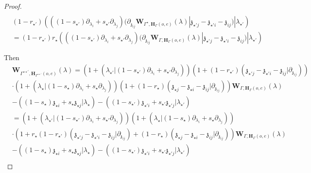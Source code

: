 \documentclass[11pt]{amsart}
\theoremstyle{definition}
\theoremstyle{remark}
\numberwithin{equation}{section}
\begin{document}
\begin{proof}
\begin{align*}
\end{align*}
\begin{align*}
   & (1-r_{\star'})   \left(((1-s_{\star'})\partial_{\lambda_i}+s_{\star'}\partial_{\lambda_j})(\partial_{\mathfrak{z}_{ij}}\mathbf{W}_{\Gamma^{\star},\mathbf{H}_{\Gamma}(o,e)}(\lambda)|\mathfrak{z}_{\star' j}-\mathfrak{z}_{\star' i}-\mathfrak{z}_{ij})|\lambda_{\star'}\right) \\
   &=  (1-r_{\star'})   r_{\star} \left(((1-s_{\star'})\partial_{\lambda_i}+s_{\star'}\partial_{\lambda_j})(\partial_{\mathfrak{z}_{ij}}\mathbf{W}_{\Gamma,\mathbf{H}_{\Gamma}(o,e)}(\lambda)|\mathfrak{z}_{\star' j}-\mathfrak{z}_{\star' i}-\mathfrak{z}_{ij})|\lambda_{\star'}\right)
\end{align*}

\fi

  Then
  \begin{align*}
& \mathbf{W}_{\Gamma^{\star\star'},\mathbf{H}_{\Gamma^{\star\star'}}(o,e)}(\lambda)  =\left(1+(\lambda_{\star'}|(1-s_{\star'})\partial_{\lambda_i}+s_{\star'}\partial_{\lambda_j})\right)\left(1+(1-r_{\star'})(\mathfrak{z}_{\star' j}-\mathfrak{z}_{\star' i}-\mathfrak{z}_{ij}|\partial_{\mathfrak{z}_{ij}})\right)\\
&\cdot \left(1+(\lambda_{\star}|(1-s_{\star})\partial_{\lambda_i}+s_{\star}\partial_{\lambda_j})\right)\left(1+(1-r_{\star})(\mathfrak{z}_{\star j}-\mathfrak{z}_{\star i}-\mathfrak{z}_{ij}|\partial_{\mathfrak{z}_{ij}})\right)\mathbf{W}_{\Gamma,\mathbf{H}_{\Gamma}(o,e)}(\lambda)\\
&-\left((1-s_{\star})\mathfrak{z}_{\star i}+s_{\star}\mathfrak{z}_{\star j}|\lambda_{\star}\right)-\left((1-s_{\star'})\mathfrak{z}_{\star' i}+s_{\star'}\mathfrak{z}_{\star' j}|\lambda_{\star'}\right) \\
&=\left(1+(\lambda_{\star'}|(1-s_{\star'})\partial_{\lambda_i}+s_{\star'}\partial_{\lambda_j})\right)\left(1+(\lambda_{\star}|(1-s_{\star})\partial_{\lambda_i}+s_{\star}\partial_{\lambda_j})\right)\\
&\cdot \left(1+r_{\star}(1-r_{\star'})(\mathfrak{z}_{\star' j}-\mathfrak{z}_{\star' i}-\mathfrak{z}_{ij}|\partial_{\mathfrak{z}_{ij}})+(1-r_{\star})(\mathfrak{z}_{\star j}-\mathfrak{z}_{\star i}-\mathfrak{z}_{ij}|\partial_{\mathfrak{z}_{ij}})\right)\mathbf{W}_{\Gamma,\mathbf{H}_{\Gamma}(o,e)}(\lambda)\\
&-\left((1-s_{\star})\mathfrak{z}_{\star i}+s_{\star}\mathfrak{z}_{\star j}|\lambda_{\star}\right)-\left((1-s_{\star'})\mathfrak{z}_{\star' i}+s_{\star'}\mathfrak{z}_{\star' j}|\lambda_{\star'}\right) \\
\end{align*}


\end{proof}
\end{document}

